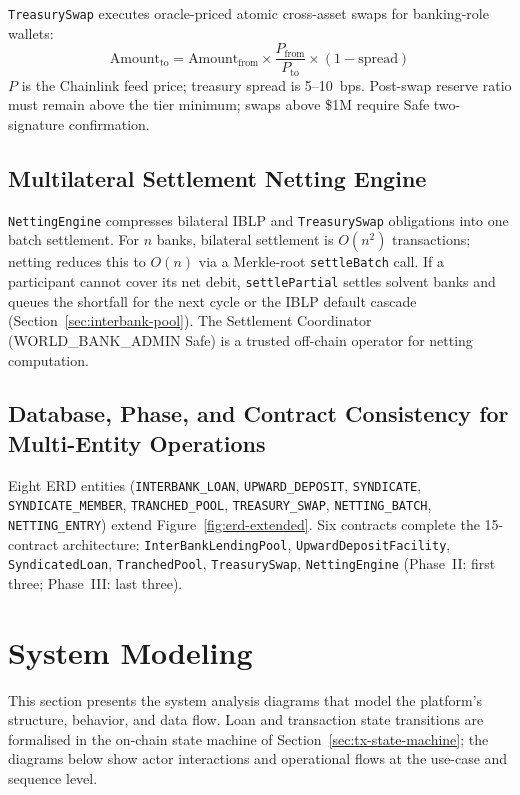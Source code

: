 \documentclass[12pt,a4paper]{report}
\begin{document}
\texttt{TreasurySwap} executes oracle-priced atomic cross-asset swaps for banking-role wallets:
\begin{equation}
\text{Amount}_{\text{to}} = \text{Amount}_{\text{from}} \times \frac{P_{\text{from}}}{P_{\text{to}}} \times (1 - \text{spread})
\end{equation}
\noindent $P$ is the Chainlink feed price; treasury spread is 5--10~bps. Post-swap reserve ratio must remain above the tier minimum; swaps above \$1M require Safe two-signature confirmation.

\subsection{Multilateral Settlement Netting Engine}
\label{sec:netting-settlement}

\texttt{NettingEngine} compresses bilateral IBLP and \texttt{TreasurySwap} obligations into one batch settlement. For $n$ banks, bilateral settlement is $O(n^2)$ transactions; netting reduces this to $O(n)$ via a Merkle-root \texttt{settleBatch} call. If a participant cannot cover its net debit, \texttt{settlePartial} settles solvent banks and queues the shortfall for the next cycle or the IBLP default cascade (Section~\ref{sec:interbank-pool}). The Settlement Coordinator (WORLD\_BANK\_ADMIN Safe) is a trusted off-chain operator for netting computation.

\subsection{Database, Phase, and Contract Consistency for Multi-Entity Operations}
\label{sec:multi-entity-consistency}

Eight ERD entities (\texttt{INTERBANK\_LOAN}, \texttt{UPWARD\_DEPOSIT}, \texttt{SYNDICATE}, \texttt{SYNDICATE\_MEMBER}, \texttt{TRANCHED\_POOL}, \texttt{TREASURY\_SWAP}, \texttt{NETTING\_BATCH}, \texttt{NETTING\_ENTRY}) extend Figure~\ref{fig:erd-extended}. Six contracts complete the 15-contract architecture: \texttt{InterBankLendingPool}, \texttt{UpwardDepositFacility}, \texttt{SyndicatedLoan}, \texttt{TranchedPool}, \texttt{TreasurySwap}, \texttt{NettingEngine} (Phase~II: first three; Phase~III: last three).

\section{System Modeling}
\label{sec:system-modeling}

This section presents the system analysis diagrams that model the platform's structure, behavior, and data flow. Loan and transaction state transitions are formalised in the on-chain state machine of Section~\ref{sec:tx-state-machine}; the diagrams below show actor interactions and operational flows at the use-case and sequence level.
\end{document}
